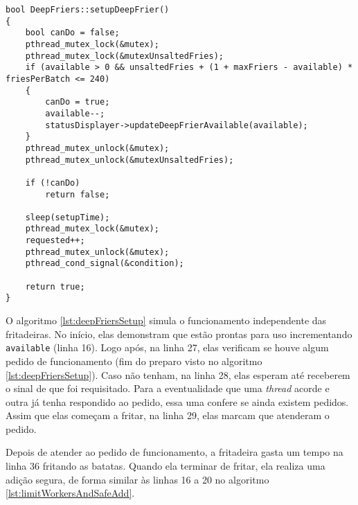 \documentclass[a4paper]{article}
\begin{document}
\begin{lstlisting}[caption=Preparação das fritadeiras.\label{lst:deepFriersSetup}]
bool DeepFriers::setupDeepFrier()
{
	bool canDo = false;
	pthread_mutex_lock(&mutex);
	pthread_mutex_lock(&mutexUnsaltedFries);
	if (available > 0 && unsaltedFries + (1 + maxFriers - available) * friesPerBatch <= 240)
	{
		canDo = true;
		available--;
		statusDisplayer->updateDeepFrierAvailable(available);
	}
	pthread_mutex_unlock(&mutex);
	pthread_mutex_unlock(&mutexUnsaltedFries);
	
	if (!canDo)
		return false;
	
	sleep(setupTime);
	pthread_mutex_lock(&mutex);
	requested++;
	pthread_mutex_unlock(&mutex);
	pthread_cond_signal(&condition);
	
	return true;
}
\end{lstlisting}

O algoritmo \ref{lst:deepFriersSetup} simula o funcionamento independente das fritadeiras. No início, elas demonstram que estão prontas para uso incrementando \texttt{available} (linha 16). Logo após, na linha 27, elas verificam se houve algum pedido de funcionamento (fim do preparo visto no algoritmo \ref{lst:deepFriersSetup}). Caso não tenham, na linha 28, elas esperam até receberem o sinal de que foi requisitado. Para a eventualidade que uma \textit{thread} acorde e outra já tenha respondido ao pedido, essa uma confere se ainda existem pedidos. Assim que elas começam a fritar, na linha 29, elas marcam que atenderam o pedido.

Depois de atender ao pedido de funcionamento, a fritadeira gasta um tempo na linha 36 fritando as batatas. Quando ela terminar de fritar, ela realiza uma adição segura, de forma similar às linhas 16 a 20  no algoritmo \ref{lst:limitWorkersAndSafeAdd}.
\end{document}

